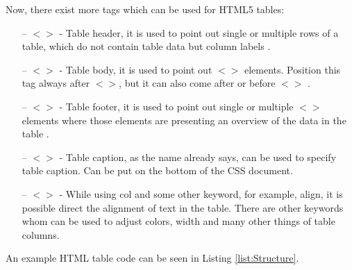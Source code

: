 Now, there exist more tags which can be used for HTML5 tables:
\begin{itemize}
    \item[--] $<$$>$ - Table header, it is used to point
out single or multiple rows of a table, which do not contain table
data but column labels \parencite{ChrisCoyier}.

    \item[--] $<$$>$ - Table body, it is used to point
out $<$$>$ elements. Position this tag always after
$<$$>$, but it can also come after or before
$<$$>$ \parencite{ChrisCoyier}.

    \item[--] $<$$>$ - Table footer, it is used to point
out single or multiple $<$$>$ elements where those elements
are presenting an overview  of the data in the table
\parencite{ChrisCoyier}.

    \item[--] $<$$>$ - Table caption, as the name
already says, can be used to specify table caption. Can be put on the
bottom of the CSS document.

    \item[--] $<$$>$ - While using col and some other
keyword, for example, align, it is possible direct the alignment of
text in the table. There are other keywords whom can be used to adjust
colors, width and many other things of table columns.
\end{itemize}

An example HTML table code can be seen in Listing \ref{list:Structure}.
